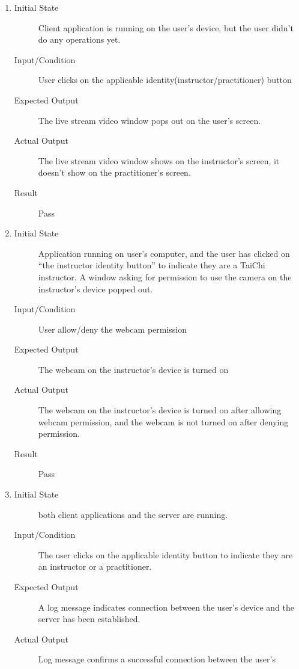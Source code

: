 \documentclass[12pt, titlepage]{article}
\begin{document}
\begin{enumerate}[FR-T1]
  \item \label{FRT1}
    \begin{description}
    \item[Initial State] Client application is running on the user's device, but the
      user didn’t do any operations yet.
    \item[Input/Condition] User clicks on the applicable
      identity(instructor/practitioner) button
    \item[Expected Output] The live stream video window pops out on the user's screen.
    \item[Actual Output] The live stream video window shows on the instructor's screen, 
    it doesn't show on the practitioner's screen.
    \item[Result] Pass
    \end{description}
  \item \label{FRT2}
    \begin{description}
    \item[Initial State] Application running on user’s computer, and the user has
      clicked on “the instructor identity button” to indicate they are a TaiChi
      instructor. A window asking for permission to use the camera on the
      instructor's device popped out.
    \item[Input/Condition] User allow/deny the webcam permission
    \item[Expected Output] The webcam on the instructor’s device is turned on
    \item[Actual Output] The webcam on the instructor’s device is turned on after 
    allowing webcam permission, and the webcam is not turned on after denying permission.
    \item[Result] Pass
    \end{description}
  \item \label{FRT3}
    \begin{description}
    \item[Initial State] both client applications and the server are running.
    \item[Input/Condition] The user clicks on the applicable identity button to
      indicate they are an instructor or a practitioner.
    \item[Expected Output] A log message indicates connection between the user’s device
      and the server has been established.
    \item[Actual Output] Log message confirms a successful connection between the user’s 

\end{description}
\end{enumerate}
\end{document}
